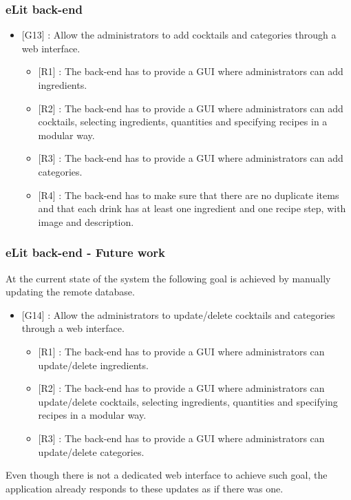 \documentclass[paper=a4, fontsize=12pt]{scrartcl}
\numberwithin{equation}{section}		%
\numberwithin{figure}{section}			%
\numberwithin{table}{section}				%
\begin{document}
\subsubsection{eLit back-end}
\begin{itemize}
\item {[G13]} : Allow the administrators to add cocktails and categories through a web interface.
\begin{itemize}
\item {[R1]} : The back-end has to provide a GUI where administrators can add ingredients.
\item {[R2]} : The back-end has to provide a GUI where administrators can add cocktails, selecting ingredients, quantities and specifying recipes in a modular way.
\item {[R3]} : The back-end has to provide a GUI where administrators can add categories.
\item {[R4]} : The back-end has to make sure that there are no duplicate items and that each drink has at least one ingredient and one recipe step, with image and description.
\end{itemize}
\end{itemize}


\subsubsection{eLit back-end - Future work}

At the current state of the system the following goal is achieved by manually updating the remote database.

\begin{itemize}
\item {[G14]} : Allow the administrators to update/delete cocktails and categories through a web interface.
\begin{itemize}
\item {[R1]} : The back-end has to provide a GUI where administrators can update/delete ingredients.
\item {[R2]} : The back-end has to provide a GUI where administrators can update/delete cocktails, selecting ingredients, quantities and specifying recipes in a modular way.
\item {[R3]} : The back-end has to provide a GUI where administrators can update/delete  categories.
\end{itemize}
\end{itemize}
Even though there is not a dedicated web interface to achieve such goal, the application already responds to these updates as if there was one.
\end{document}
